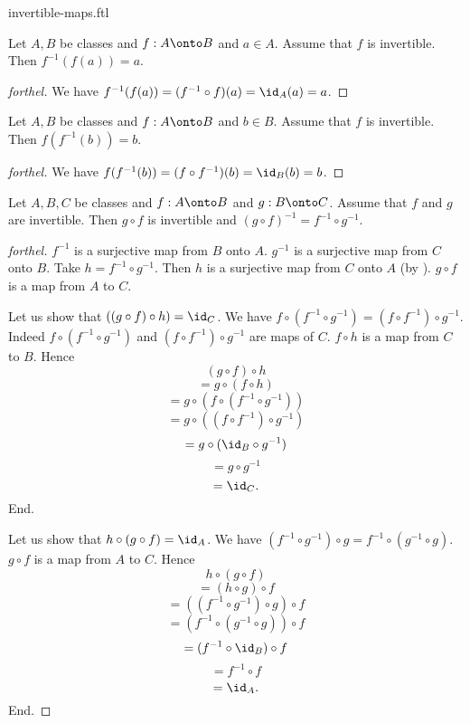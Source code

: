 \documentclass{naproche-library}
\begin{document}
\begin{smodule}{invertible-maps.ftl}
  \begin{proposition}[forthel,id=FOUNDATIONS_09_4606651604664320]
    Let $A, B$ be classes and $f : A \onto B$ and $a \in A$.
    Assume that $f$ is invertible.
    Then $f^{-1}(f(a)) = a$.
  \end{proposition}
  \begin{proof}[forthel]
    We have $f^{-1}(f(a)) = (f^{-1} \circ f)(a) = \id_{A}(a) = a$.
  \end{proof}

  \begin{proposition}[forthel,id=FOUNDATIONS_09_6093864386712935]
    Let $A, B$ be classes and $f : A \onto B$ and $b \in B$.
    Assume that $f$ is invertible.
    Then $f(f^{-1}(b)) = b$.
  \end{proposition}
  \begin{proof}[forthel]
    We have
    $f(f^{-1}(b))
      = (f \circ f^{-1})(b)
      = \id_{B}(b)
      = b$.
  \end{proof}

  \begin{proposition}[forthel,id=FOUNDATIONS_09_7619151963095040]
    Let $A, B, C$ be classes and $f : A \onto B$ and $g : B \onto C$.
    Assume that $f$ and $g$ are invertible.
    Then $g \circ f$ is invertible and $(g \circ f)^{-1} = f^{-1} \circ g^{-1}$.
  \end{proposition}
  \begin{proof}[forthel]
    $f^{-1}$ is a surjective map from $B$ onto $A$.
    $g^{-1}$ is a surjective map from $C$ onto $B$.
    Take $h = f^{-1} \circ g^{-1}$.
    Then $h$ is a surjective map from $C$ onto $A$ (by ).
    $g \circ f$ is a map from $A$ to $C$.

    Let us show that $((g \circ f) \circ h) = \id_{C}$.
      We have $f \circ (f^{-1} \circ g^{-1}) = (f \circ f^{-1}) \circ g^{-1}$.
      Indeed $f \circ (f^{-1} \circ g^{-1})$ and $(f \circ f^{-1}) \circ g^{-1}$ are maps of $C$.
      $f \circ h$ is a map from $C$ to $B$.
      Hence
      \[  (g \circ f) \circ h                           \]
      \[    = g \circ (f \circ h)                       \]
      \[    = g \circ (f \circ (f^{-1} \circ g^{-1}))   \]
      \[    = g \circ ((f \circ f^{-1}) \circ g^{-1})   \]
      \[    = g \circ (\id_{B} \circ g^{-1})            \]
      \[    = g \circ g^{-1}                            \]
      \[    = \id_{C}.                                  \]
    End.

    Let us show that $h \circ (g \circ f) = \id_{A}$.
      We have $(f^{-1} \circ g^{-1}) \circ g = f^{-1} \circ (g^{-1} \circ g)$.
      $g \circ f$ is a map from $A$ to $C$.
      Hence
      \[  h \circ (g \circ f)                           \]
      \[    = (h \circ g) \circ f                       \]
      \[    = ((f^{-1} \circ g^{-1}) \circ g) \circ f   \]
      \[    = (f^{-1} \circ (g^{-1} \circ g)) \circ f   \]
      \[    = (f^{-1} \circ \id_{B}) \circ f            \]
      \[    = f^{-1} \circ f                            \]
      \[    = \id_{A}.                                  \]
    End.


\end{proof}
\end{smodule}
\end{document}
